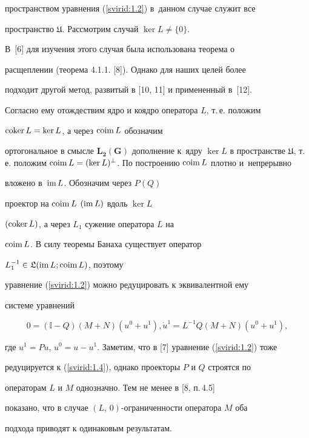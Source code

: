 пространством урав\-не\-ния (\ref{svirid:1.2}) в~данном случае служит все

пространство $\mathfrak{U}$. Рассмотрим слу\-чай $\ker L\neq\{0\}$.

В~[6] для изучения этого случая была использована теорема о

расщеплении (теорема 4.1.1. [8]). Однако для наших целей более

подходит другой метод, развитый в [10, 11] и примененный в~[12].

Со\-глас\-но ему отождествим ядро и коядро оператора $L$, т.\,е. положим

${\rm coker}\, L=\ker L$, а через ${\rm coim \, } L$ обозначим

ортогональное в смысле $\mathbf{L_2(G)}$ дополнение к~ядру $\ker

L$ в пространстве $\mathfrak{U}$, т.\,е. положим ${\rm coim \, }

L=(\ker L)^\bot$. По по\-строе\-нию ${\rm coim \, } L$ плотно и~непрерывно

вложено в~${\rm im \, } L$. Обозначим через $P(Q)$

про\-ек\-тор на ${\rm coim \, } L$ $({\rm im \, } L)$ вдоль $\ker L$

$({\rm coker \, } L)$, а через $L_1$ сужение оператора $L$ на

${\rm coim \, } L$. В силу теоремы Банаха существует оператор

$L_1^{-1}\in\mathfrak{L}({\rm im \, } L; {\rm coim \, } L)$, поэтому

уравнение (\ref{svirid:1.2}) можно редуцировать к эк\-ви\-ва\-лент\-ной ему

системе уравнений

\begin{equation}\label{svirid:1.4}

0=(\mathbb{I}-Q)(M+N)(u^0+u^1), \dot{u}^1=L^{-1}Q(M+N)(u^0+u^1),

\end{equation}

где $u^1=Pu$, $u^0=u-u^1$. Заметим, что в [7] уравнение (\ref{svirid:1.2}) тоже

ре\-ду\-ци\-ру\-ет\-ся к (\ref{svirid:1.4}), однако проекторы $P$ и $Q$ строятся по

операторам $L$ и $M$ однозначно. Тем не менее в [8, п.\,4.5]

показано, что в случае $(L,\,0)$-ограниченности оператора $M$ оба

подхода приводят к одинаковым ре\-зуль\-та\-там.



